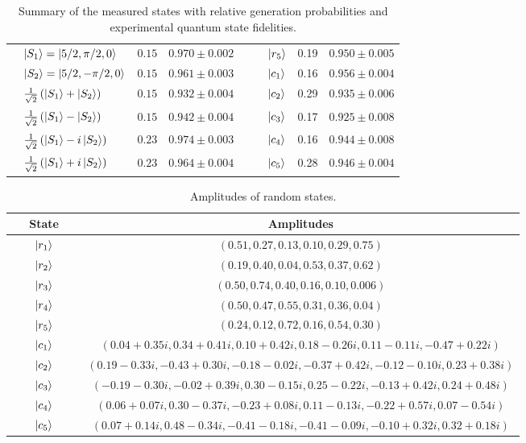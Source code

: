 \begin{table}[tbh]
\begin{tabular}{lcc|lcc}
 $\quad\ket{S_1}=\ket{5/2,\pi /2,0}$   & $0.15$ & $0.970 \pm 0.002\quad$ &$\quad\ket{r_5}$ & 0.19 & $0.950\pm0.005$  \\
 $\quad\ket{S_2}=\ket{5/2,-\pi /2,0}$ & $0.15$ & $0.961 \pm 0.003\quad$ &$\quad\ket{c_1}$ &0.16 & $0.956\pm0.004$ \\
 $\quad\frac{1}{\sqrt{2}}\left(\ket{S_1}+\ket{S_2}\right)$ & $0.15$ & $0.932 \pm 0.004\quad$&$\quad\ket{c_2}$ & 0.29 &$0.935 \pm 0.006$  \\
 $\quad\frac{1}{\sqrt{2}}\left(\ket{S_1}-\ket{S_2}\right)$ & $0.15$ & $0.942 \pm 0.004\quad$& $\quad\ket{c_3}$& 0.17 & $0.925\pm 0.008$ \\
$\quad\frac{1}{\sqrt{2}}\left(\ket{S_1}-i\ket{S_2}\right)$ & $0.23$ & $0.974 \pm 0.003\quad$&$\quad\ket{c_4}$ & 0.16 & $0.944\pm0.008$\\
$\quad\frac{1}{\sqrt{2}}\left(\ket{S_1}+i\ket{S_2}\right)$ & $0.23$ & $0.964 \pm 0.004\quad$& $\quad\ket{c_5}$ & 0.28 & $0.946\pm0.004$\\
\bottomrule
\end{tabular}
\caption{%
	Summary of the measured states with relative generation probabilities and experimental quantum state fidelities.
}
\label{table:expQWs:summary}
\end{table}

\begin{table}[tbh]
\centering\footnotesize
\begin{tabular}{cc}
\toprule
State & Amplitudes \\
\midrule
$\qquad\ket{r_1}\qquad$& $\left( 0.51, 0.27, 0.13, 0.10, 0.29, 0.75\right)$\\
$\qquad\ket{r_2}\qquad$& $\left( 0.19, 0.40, 0.04, 0.53, 0.37, 0.62\right)$\\
$\qquad\ket{r_3}\qquad$&$\left( 0.50, 0.74, 0.40, 0.16, 0.10, 0.006\right)$ \\
$\qquad\ket{r_4}\qquad$& $\left( 0.50, 0.47, 0.55, 0.31, 0.36, 0.04\right)$ \\
$\qquad\ket{r_5}\qquad$& $\left( 0.24, 0.12, 0.72, 0.16, 0.54, 0.30\right)$ \\
$\qquad\ket{c_1}\qquad$& $\left( 0.04+0.35i, 0.34+0.41i, 0.10+0.42i, 0.18-0.26i, 0.11-0.11i, -0.47+0.22i\right)$  \\
$\qquad\ket{c_2}\qquad$& $\left( 0.19-0.33i, -0.43+0.30i, -0.18-0.02i, -0.37+0.42i, -0.12-0.10i, 0.23+0.38i\right)$\\
$\qquad\ket{c_3}\qquad$& $\left( -0.19-0.30i, -0.02+0.39i, 0.30-0.15i, 0.25-0.22i, -0.13+0.42i, 0.24+0.48i\right)$\\
$\qquad\ket{c_4}\qquad$& $\left( 0.06+0.07i, 0.30-0.37i, -0.23+0.08i, 0.11-0.13i, -0.22+0.57i, 0.07-0.54i\right)$\\
$\qquad\ket{c_5}\qquad$& $\left( 0.07+0.14i, 0.48-0.34i, -0.41-0.18i, -0.41-0.09i, -0.10+0.32i, 0.32+0.18i\right)$\\
\bottomrule
\end{tabular}
\caption{Amplitudes of random states.}
\label{table:expQWs:random_states_amps}
\end{table}


